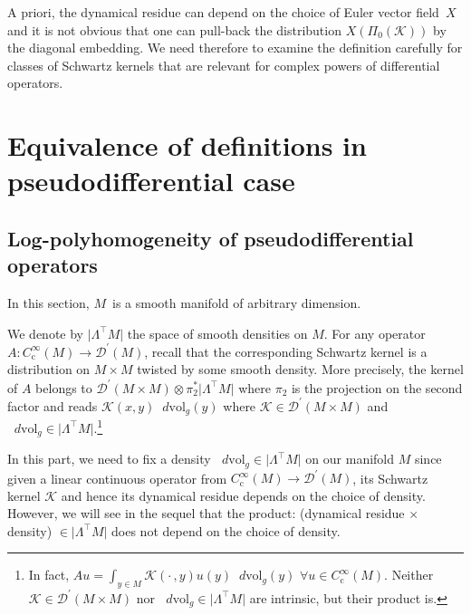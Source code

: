 \documentclass[JEP,XML,SOM,Unicode]{cedram}
\let\pazocal\mathscr
\newcommand{\LtM}{\Lambda^{\!\!\top\!}M}
\theoremstyle{definition}
\newcommand\cD{{\pazocal D}}
\renewcommand\c{\mathrm{c}}
\let\euler X
\newcommand\dvol{\mathop{}\!d\mathrm{vol}}
\begin{document}
A priori, the dynamical residue can depend on the choice of Euler vector field~$\euler$ and it is not obvious that one can pull-back the distribution $\euler (\Pi_0(\pazocal{K}))$ by the diagonal embedding. We need therefore to examine the definition carefully for classes of Schwartz kernels that are relevant for complex powers of differential operators.

\section{Equivalence of definitions in pseudodifferential case}\label{ss:wodzickipdo}

\subsection{Log-polyhomogeneity of pseudodifferential operators}

In this section, $M$~is a smooth manifold of arbitrary dimension.

We denote by $\vert \LtM \vert$ the space of smooth densities
on $M$. For any operator \hbox{$A:C^\infty_\c(M)\to \cD^\prime(M)$}, recall that the corresponding Schwartz kernel is a distribution on $M\times M$ twisted by some smooth density. More precisely, the kernel of $A$ belongs to $\cD^\prime(M\times M)\otimes \pi_2^*\vert \LtM \vert$ where $\pi_2$ is the projection
on the second factor and reads $\pazocal{K}(x,y)\dvol_g(y)$ where $\pazocal{K}\in \cD^\prime(M\times M)$ and $\dvol_g\in \vert \LtM \vert$.\footnote{In fact, $Au=\int_{y\in M} \pazocal{K}(\cdot\,,y)u(y)\dvol_g(y)$ $\forall u\in C^\infty_\c(M)$. Neither $\pazocal{K}\in \cD^\prime(M\times M)$ nor $\dvol_g\in \vert \LtM \vert$ are intrinsic, but their product is.}

In this part, we need to fix a density $\dvol_g\in \vert \LtM \vert$ on our manifold $M$ since given a linear continuous operator from $C^\infty_\c(M)\to \pazocal{D}^\prime(M)$, its Schwartz kernel $ \pazocal{K}$ and hence its dynamical residue depends on the choice of density. However, we will see in the sequel that the product: (dynamical residue $\times$ density) $\in \vert \LtM \vert$ does not depend on the choice of density.
\end{document}
